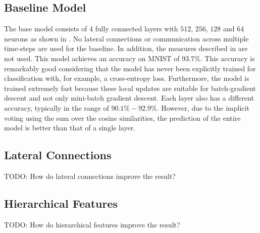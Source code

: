 \subsection{Baseline Model}
The base model consists of $4$ fully connected layers with $512$, $256$, $128$ and $64$ neurons as shown in .
No lateral connections or communication across multiple time-steps are used for the baseline. In addition, the measures described in  are not used.
This model achieves an accuracy on MNIST of $93.7\%$. This accuracy is remarkably good considering that the model has never been explicitly trained for classification with, for example, a cross-entropy loss.
Furthermore, the model is trained extremely fast because these local updates are suitable for batch-gradient descent and not only mini-batch gradient descent.
Each layer also has a different accuracy, typically in the range of $90.1\% - 92.9\%$. However, due to the implicit voting using the sum over the cosine similarities, the prediction of the entire model is better than that of a single layer.


\subsection{Lateral Connections}
TODO: How do lateral connections improve the result?


\subsection{Hierarchical Features}
TODO: How do hierarchical features improve the result?











